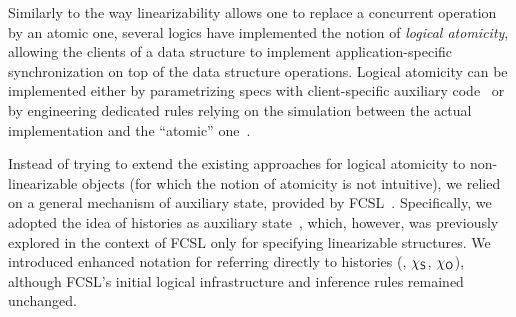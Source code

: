 Similarly to the way linearizability allows one to replace a
concurrent operation by an atomic one, several logics have implemented
the notion of \emph{logical atomicity}, allowing the clients of a data
structure to implement application-specific synchronization on top of
the data structure operations.
%
Logical atomicity can be implemented either by parametrizing specs
with client-specific auxiliary
code~\cite{Jacobs-Piessens:POPL11,Svendsen-al:ESOP13,Svendsen-Birkedal:ESOP14,Jung-al:POPL15}
or by engineering dedicated rules relying on the simulation between
the actual implementation and the ``atomic''
one~\cite{ArrozPincho-al:ECOOP14}.
%

Instead of trying to extend the existing approaches for logical
atomicity to non-linearizable objects (for which the notion of
atomicity is not intuitive), we relied on a general mechanism of
auxiliary state, provided by FCSL~\cite{Nanevski-al:ESOP14}. 
%
Specifically, we adopted the idea of histories as auxiliary
state~\cite{Sergey-al:ESOP15}, which, however, was previously explored
in the context of FCSL only for specifying linearizable structures.
%
%
% 
We introduced enhanced notation for referring directly to histories
(\eg, $\chi_{\mathsf{S}}$, $\chi_{\mathsf{O}}$), although FCSL's initial logical
infrastructure and inference rules remained unchanged.


